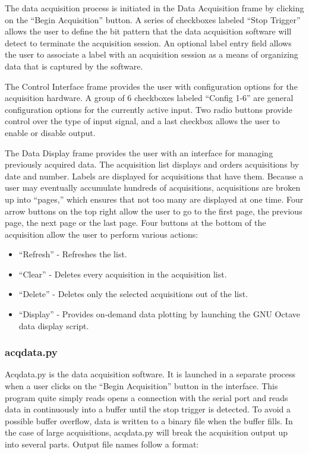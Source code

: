 The data acquisition process is initiated in the Data Acquisition frame by clicking on the 
``Begin Acquisition'' button. A series of checkboxes labeled ``Stop Trigger'' allows the user
 to define the bit pattern that the data acquisition software will detect to terminate the 
acquisition session. An optional label entry field allows the user to associate a label with 
an acquisition session as a means of organizing data that is captured by the software.


The Control Interface frame provides the user with configuration options for the acquisition
hardware. A group of 6 checkboxes labeled ``Config 1-6'' are general configuration options for
the currently active input. Two radio buttons provide control over the type of input signal,
and a last checkbox allows the user to enable or disable output.


The Data Display frame provides the user with an interface for managing previously acquired
data. The acquisition list displays and orders acquisitions by date and number. Labels are
displayed for acquisitions that have them. Because a user may eventually accumulate hundreds
of acquisitions, acquisitions are broken up into ``pages,'' which ensures that not too many
are displayed at one time. Four arrow buttons on the top right allow the user to go to the first 
page, the previous page, the next page or the last page. Four buttons at the bottom of the 
acquisition allow the user to perform various actions:

\begin{itemize}
\item ``Refresh'' - Refreshes the list.
\item ``Clear'' - Deletes every acquisition in the acquisition list.
\item ``Delete'' - Deletes only the selected acquisitions out of the list.
\item ``Display'' - Provides on-demand data plotting by launching the GNU Octave data display script.
\end{itemize}


\subsubsection[acqdata.py]{acqdata.py}
Acqdata.py is the data acquisition software. It is launched in a separate process when a user 
clicks on the ``Begin Acquisition'' button in the interface. This program quite simply reads
opens a connection with the serial port and reads data in continuously into a buffer until the 
stop trigger is detected. To avoid a possible buffer overflow, data is written to a binary file
when the buffer fills. In the case of large acquisitions, acqdata.py will break the acquisition 
output up into several parts. Output file names follow a format: \\

